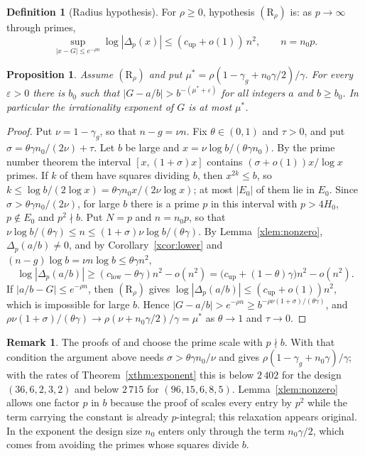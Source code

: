 \documentclass[11pt]{article}
\newtheorem{proposition}[theorem]{Proposition}
\theoremstyle{definition}
\newtheorem{definition}[theorem]{Definition}
\newtheorem{remark}[theorem]{Remark}
\begin{document}
\begin{definition}[Radius hypothesis]\label{xdef:radius}
For $\rho\ge0$, hypothesis $(\mathrm R_\rho)$ is: as $p\to\infty$ through primes,
\[
\sup_{|x-G|\le e^{-\rho n}}\log|\Delta_p(x)|\le(c_{\mathrm{up}}+o(1))\,n^2,\qquad n=n_0p .
\]
\end{definition}

\begin{proposition}\label{xprop:power}
Assume $(\mathrm R_\rho)$ and put $\mu^*=\rho(1-\gamma_g+n_0\gamma/2)/\gamma$. For every $\varepsilon>0$ there is $b_0$ such that $|G-a/b|>b^{-(\mu^*+\varepsilon)}$ for all integers $a$ and $b\ge b_0$. In particular the irrationality exponent of $G$ is at most $\mu^*$.
\end{proposition}

\begin{proof}
Put $\nu=1-\gamma_g$, so that $n-g=\nu n$. Fix $\theta\in(0,1)$ and $\tau>0$, and put $\sigma=\theta\gamma n_0/(2\nu)+\tau$. Let $b$ be large and $x=\nu\log b/(\theta\gamma n_0)$. By the prime number theorem the interval $[x,(1+\sigma)x]$ contains $(\sigma+o(1))x/\log x$ primes. If $k$ of them have squares dividing $b$, then $x^{2k}\le b$, so $k\le\log b/(2\log x)=\theta\gamma n_0x/(2\nu\log x)$; at most $|E_0|$ of them lie in $E_0$. Since $\sigma>\theta\gamma n_0/(2\nu)$, for large $b$ there is a prime $p$ in this interval with $p>4H_0$, $p\notin E_0$ and $p^2\nmid b$. Put $N=p$ and $n=n_0p$, so that $\nu\log b/(\theta\gamma)\le n\le(1+\sigma)\nu\log b/(\theta\gamma)$. By Lemma~\ref{xlem:nonzero}, $\Delta_p(a/b)\ne0$, and by Corollary~\ref{xcor:lower} and $(n-g)\log b=\nu n\log b\le\theta\gamma n^2$,
\[
\log|\Delta_p(a/b)|\ge(c_{\mathrm{low}}-\theta\gamma)n^2-o(n^2)=\big(c_{\mathrm{up}}+(1-\theta)\gamma\big)n^2-o(n^2).
\]
If $|a/b-G|\le e^{-\rho n}$, then $(\mathrm R_\rho)$ gives $\log|\Delta_p(a/b)|\le(c_{\mathrm{up}}+o(1))n^2$, which is impossible for large $b$. Hence $|G-a/b|>e^{-\rho n}\ge b^{-\rho\nu(1+\sigma)/(\theta\gamma)}$, and $\rho\nu(1+\sigma)/(\theta\gamma)\to\rho(\nu+n_0\gamma/2)/\gamma=\mu^*$ as $\theta\to1$ and $\tau\to0$.
\end{proof}

\begin{remark}\label{xrem:pdivb}
The proofs of \cite{Jha} and \cite{Litsey} choose the prime scale with $p\nmid b$. With that condition the argument above needs $\sigma>\theta\gamma n_0/\nu$ and gives $\rho(1-\gamma_g+n_0\gamma)/\gamma$; with the rates of Theorem~\ref{xthm:exponent} this is below $2\,402$ for the design $(36,6,2,3,2)$ and below $2\,715$ for $(96,15,6,8,5)$. Lemma~\ref{xlem:nonzero} allows one factor $p$ in $b$ because the proof of \cite[Prop.~4.1]{OAI} scales every entry by $p^2$ while the term carrying the constant is already $p$-integral; this relaxation appears original. In the exponent the design size $n_0$ enters only through the term $n_0\gamma/2$, which comes from avoiding the primes whose squares divide $b$.
\end{remark}
\end{document}
